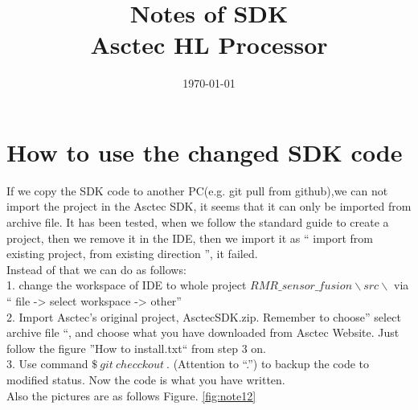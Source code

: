 \documentclass[twoside,colorbacktitle,accentcolor=tud6a]{tudexercise}
\title{Notes of  SDK \\Asctec HL Processor}
\subtitle{\today}
\begin{document}
\renewcommand{\figurename}{Figure.} 	
\setcounter{section}{0}
\maketitle
  \section{How to use the changed SDK code}
 If we copy the SDK code to another PC(e.g. git pull from github),we can not import the project in the Asctec SDK, it seems that it can only be imported from archive file. It has been tested, when we follow the standard guide to create a project, then we remove it in the IDE, then we import it as `` import from existing project, from existing direction '', it failed. \\
 
 Instead of that we can do as follows:\\
  1. change the workspace of IDE to whole project $RMR\_sensor\_fusion \backslash src  \backslash  $ via `` file -> select workspace -> other''\\
  2. Import Asctec's original project, AsctecSDK.zip. Remember to choose'' select archive file ``, and choose what you have downloaded from Asctec Website. Just follow the figure ''How to install.txt`` from step 3 on.\\
  3. Use command $ \$\ git\ checckout\ . $ (Attention to ``.'') to backup the code to modified status. Now the code is what you have written. \\
  
  Also the pictures are as follows Figure. \ref{fig:note12} \\
  
\end{document}
